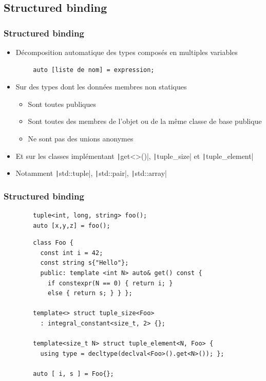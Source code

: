\documentclass[C++.tex]{subfiles}
\begin{document}
\subsection*{Structured binding}
\begin{frame}[fragile]
	\frametitle{Structured binding}
	\begin{itemize}
		\item Décomposition automatique des types composés en multiples variables
	\end{itemize}

	\begin{verbatim}
		auto [liste de nom] = expression;
	\end{verbatim}

	\begin{itemize}
		\item Sur des types dont les données membres non statiques
		\begin{itemize}
			\item Sont toutes publiques
			\item Sont toutes des membres de l'objet ou de la même classe de base publique
			\item Ne sont pas des unions anonymes
		\end{itemize}
		\item Et sur les classes implémentant \texttt|get<>()|, \texttt|tuple_size| et \texttt|tuple_element|	
		\item Notamment \texttt|std::tuple|, \texttt|std::pair|, \texttt|std::array|
	\end{itemize}
\end{frame}

\begin{frame}[fragile]
	\frametitle{Structured binding}
	\begin{verbatim}
		tuple<int, long, string> foo();
		auto [x,y,z] = foo();
	\end{verbatim}

	\begin{verbatim}
		class Foo {
		  const int i = 42;
		  const string s{"Hello"}; 
		  public: template <int N> auto& get() const {
		    if constexpr(N == 0) { return i; }
		    else { return s; } } };

		template<> struct tuple_size<Foo>
		  : integral_constant<size_t, 2> {};

		template<size_t N> struct tuple_element<N, Foo> {
		  using type = decltype(declval<Foo>().get<N>()); };

		auto [ i, s ] = Foo{};
	\end{verbatim}

\end{frame}
\end{document}
